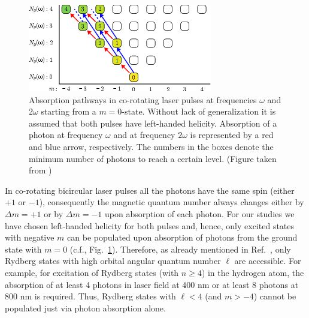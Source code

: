 \begin{figure}[!ht]
 \centering
  \includegraphics[width=0.75\columnwidth]{figs/Rydberg/co_rotating_absorbtion.png}
 \caption{\label{fig:co-pathways}
 Absorption pathways in co-rotating laser pulses at frequencies $\omega$ and $2 \omega$ starting from a $m=0$-state. Without lack of generalization it is assumed that both pulses have left-handed helicity. Absorption of a photon at frequency $\omega$ and at frequency $2 \omega$ is represented by a red and blue arrow, respectively. The numbers in the boxes denote the minimum number of photons to reach a certain level. (Figure taken from \cite{venzke2020_ryd})
 }
 \end{figure}

In co-rotating bicircular laser pulses all the photons have the same spin (either $+1$ or $-1$), consequently the magnetic quantum number always changes either by $\Delta m = +1$ or by $\Delta m = -1$ upon absorption of each photon. For our studies we have chosen left-handed helicity for both pulses and, hence, only excited states with negative $m$ can be populated upon absorption of photons from the ground state with $m=0$ (c.f., Fig.\ \ref{fig:co-pathways}). Therefore, as already mentioned in Ref.\ \cite{mancuso2017}, only Rydberg states with high orbital angular quantum number $\ell$ are accessible. For example, for excitation of Rydberg states (with $n \ge 4$) in the hydrogen atom, the absorption of at least 4 photons in laser field at 400 nm or at least 8 photons at 800 nm is required. Thus, Rydberg states with $\ell < 4$ (and $m > -4$) cannot be populated just via photon absorption alone.

